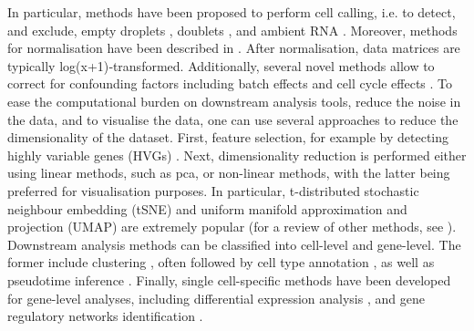 In particular, methods have been proposed to perform  cell calling, i.e. to detect, and exclude, empty droplets \cite{lun2019emptydrops}, doublets \cite{wolock2019scrublet, mcginnis2019doubletfinder, depasquale2018doubletdecon}, and ambient RNA \cite{young2020soupx}.
Moreover, methods for normalisation have been described in \cite{lun2016pooling, vallejos2017normalizing, weinreb2018spring}.
After normalisation, data matrices are typically log(x+1)‐transformed. 
Additionally, several novel methods allow to correct for confounding factors including batch effects \cite{haghverdi2018batch, butler2018integrating, nowotschin2019emergent, stuart2019comprehensive, welch2019single, polanski2020bbknn} and
cell cycle effects \cite{scialdone2015computational, mcdavid2016reply}.
To ease the computational burden on downstream analysis tools, reduce the noise in the data, and to visualise the data, one can use several approaches to reduce the dimensionality of the dataset.
First, feature selection, for example by detecting highly variable genes (HVGs) \cite{brennecke2013accounting, yip2019evaluation}.
Next, dimensionality reduction is performed either using linear methods, such as \gls{pca}, or non-linear methods, with the latter being preferred for visualisation purposes.
In particular, t-distributed stochastic neighbour embedding (tSNE)  \cite{maaten2008visualizing} and uniform manifold approximation and projection (UMAP) \cite{mcinnes2018umap} are extremely popular (for a review of other methods, see \cite{moon2018manifold}). 
Downstream analysis methods can be classified into cell-level and gene-level.
The former include clustering \cite{kiselev2017sc3, traag2019louvain}, often followed by cell type annotation \cite{kiselev2018scmap}, as well as pseudotime inference \cite{haghverdi2016diffusion, trapnell2014dynamics, bendall2014single, wolf2019paga}.
Finally, single cell-specific methods have been developed for gene-level analyses, including differential expression analysis \cite{finak16others}, and gene regulatory networks identification \cite{matsumoto2017scode, chan2017gene, aibar2017scenic}.\\


